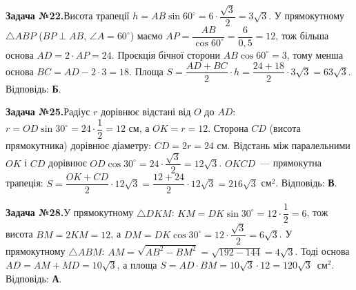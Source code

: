 \documentclass[12pt]{article}
\begin{document}
\par\vspace{0.3cm}\noindent\hypertarget{sol:22}{}
\begin{tcolorbox}[colback=titleBg!40, colframe=mainGreen!55, boxrule=0.4pt, arc=2pt, left=6pt, right=6pt, top=4pt, bottom=4pt, breakable]
\noindent\small\textbf{Задача №22.}\quad Висота трапеції $h=AB\sin60^\circ=6\cdot\dfrac{\sqrt3}{2}=3\sqrt3$. У прямокутному $\triangle ABP$ ($BP\perp AB$, $\angle A=60^\circ$) маємо $AP=\dfrac{AB}{\cos60^\circ}=\dfrac{6}{0{,}5}=12$, тож більша основа $AD=2\cdot AP=24$. Проєкція бічної сторони $AB\cos60^\circ=3$, тому менша основа $BC=AD-2\cdot3=18$. Площа $S=\dfrac{AD+BC}{2}\cdot h=\dfrac{24+18}{2}\cdot3\sqrt3=63\sqrt3$. Відповідь: \textbf{Б}.
\par\vspace{0.1cm}\hfill\hyperlink{task:22}{}
\end{tcolorbox}
\par\vspace{0.3cm}\noindent\hypertarget{sol:25}{}
\begin{tcolorbox}[colback=titleBg!40, colframe=mainGreen!55, boxrule=0.4pt, arc=2pt, left=6pt, right=6pt, top=4pt, bottom=4pt, breakable]
\noindent\small\textbf{Задача №25.}\quad Радіус $r$ дорівнює відстані від $O$ до $AD$: $r = OD\sin30^\circ = 24\cdot\dfrac12 = 12$ см, а $OK = r = 12$. Сторона $CD$ (висота прямокутника) дорівнює діаметру: $CD = 2r = 24$ см. Відстань між паралельними $OK$ і $CD$ дорівнює $OD\cos30^\circ = 24\cdot\dfrac{\sqrt3}{2} = 12\sqrt3$. $OKCD$~--- прямокутна трапеція: $S = \dfrac{OK + CD}{2}\cdot 12\sqrt3 = \dfrac{12+24}{2}\cdot 12\sqrt3 = 216\sqrt3$ см$^2$. Відповідь: \textbf{В}.
\par\vspace{0.1cm}\hfill\hyperlink{task:25}{}
\end{tcolorbox}
\par\vspace{0.3cm}\noindent\hypertarget{sol:28}{}
\begin{tcolorbox}[colback=titleBg!40, colframe=mainGreen!55, boxrule=0.4pt, arc=2pt, left=6pt, right=6pt, top=4pt, bottom=4pt, breakable]
\noindent\small\textbf{Задача №28.}\quad У прямокутному $\triangle DKM$: $KM=DK\sin30^\circ=12\cdot\dfrac{1}{2}=6$, тож висота $BM=2KM=12$, а $DM=DK\cos30^\circ=12\cdot\dfrac{\sqrt3}{2}=6\sqrt3$. У прямокутному $\triangle ABM$: $AM=\sqrt{AB^2-BM^2}=\sqrt{192-144}=4\sqrt3$. Тоді основа $AD=AM+MD=10\sqrt3$, а площа $S=AD\cdot BM=10\sqrt3\cdot12=120\sqrt3$~см$^2$. Відповідь: \textbf{А}.
\par\vspace{0.1cm}\hfill\hyperlink{task:28}{}
\end{tcolorbox}
\end{document}
